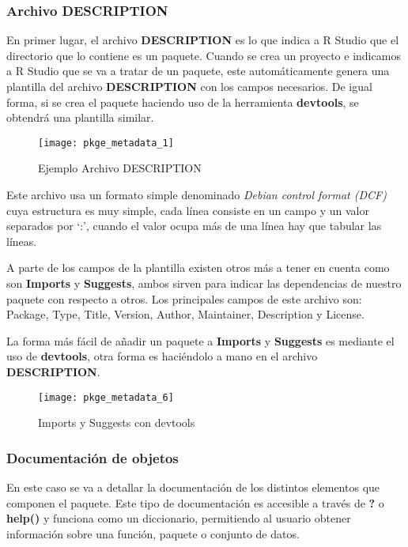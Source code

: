 \subsubsection{Archivo DESCRIPTION}

En primer lugar, el archivo \textbf{DESCRIPTION} es lo que indica a R Studio que el directorio que lo
contiene es un paquete. Cuando se crea un proyecto e indicamos a R Studio que se va a
tratar de un paquete, este autom\'aticamente genera una plantilla del archivo \textbf{DESCRIPTION}
con los campos necesarios. De igual forma, si se crea el paquete haciendo uso de la herramienta \textbf{devtools}, se obtendr\'a
una plantilla similar.

\begin{figure}[H]
    \centering
    \texttt{[image: pkge\_metadata\_1]}
    \caption{Ejemplo Archivo DESCRIPTION }
    \label{fig:description}
\end{figure}

Este archivo usa un formato simple denominado \textit{Debian control format (DCF)} cuya estructura
es muy simple, cada l\'inea consiste en un campo y un valor separados por \enquote*{:}, cuando el valor
ocupa m\'as de una l\'inea hay que tabular las l\'ineas.

A parte de los campos de la plantilla existen otros m\'as a tener en cuenta como son \textbf{Imports}
y \textbf{Suggests}, ambos sirven para indicar las dependencias de nuestro paquete con respecto a otros.
Los principales campos de este archivo son: Package, Type, Title, Version, Author, Maintainer, Description y License.

La forma m\'as f\'acil de a\~nadir un paquete a \textbf{Imports} y \textbf{Suggests} es mediante el uso de
\textbf{devtools}, otra forma es haci\'endolo a mano en el archivo \textbf{DESCRIPTION}.

\begin{figure}[H]
    \centering
    \texttt{[image: pkge\_metadata\_6]}
    \caption{Imports y Suggests con devtools }
    \label{fig:import_suggest}
\end{figure}

\subsubsection{Documentaci\'on de objetos}

En este caso se va a detallar la documentaci\'on de los distintos elementos que componen el
paquete.
Este tipo de documentaci\'on es accesible a trav\'es de \textbf{?} o \textbf{help()} y funciona como un
diccionario, permitiendo al usuario obtener informaci\'on sobre una funci\'on, paquete o conjunto
de datos.\\

